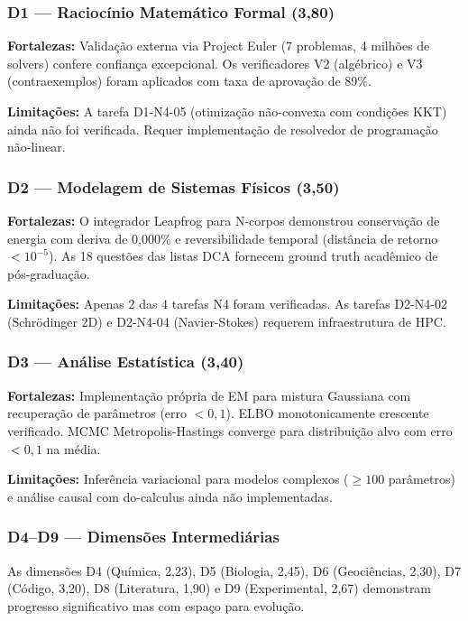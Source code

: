 \documentclass[12pt,a4paper,oneside]{article}
\begin{document}
\subsubsection{D1 — Raciocínio Matemático Formal (3,80)}

\textbf{Fortalezas:} Validação externa via Project Euler (7 problemas, 4 milhões
de solvers) confere confiança excepcional. Os verificadores V2 (algébrico) e
V3 (contraexemplos) foram aplicados com taxa de aprovação de 89\%.

\textbf{Limitações:} A tarefa D1-N4-05 (otimização não-convexa com condições
KKT) ainda não foi verificada. Requer implementação de resolvedor de
programação não-linear.

\subsubsection{D2 — Modelagem de Sistemas Físicos (3,50)}

\textbf{Fortalezas:} O integrador Leapfrog para N-corpos demonstrou conservação
de energia com deriva de 0,000\% e reversibilidade temporal (distância de
retorno $<10^{-5}$). As 18 questões das listas DCA fornecem ground truth
acadêmico de pós-graduação.

\textbf{Limitações:} Apenas 2 das 4 tarefas N4 foram verificadas. As tarefas
D2-N4-02 (Schrödinger 2D) e D2-N4-04 (Navier-Stokes) requerem infraestrutura
de HPC.

\subsubsection{D3 — Análise Estatística (3,40)}

\textbf{Fortalezas:} Implementação própria de EM para mistura Gaussiana com
recuperação de parâmetros (erro $<0{,}1$). ELBO monotonicamente crescente
verificado. MCMC Metropolis-Hastings converge para distribuição alvo com
erro $<0{,}1$ na média.

\textbf{Limitações:} Inferência variacional para modelos complexos ($\geq 100$
parâmetros) e análise causal com do-calculus ainda não implementadas.

\subsubsection{D4–D9 — Dimensões Intermediárias}

As dimensões D4 (Química, 2,23), D5 (Biologia, 2,45), D6 (Geociências, 2,30),
D7 (Código, 3,20), D8 (Literatura, 1,90) e D9 (Experimental, 2,67) demonstram
progresso significativo mas com espaço para evolução.
\end{document}
